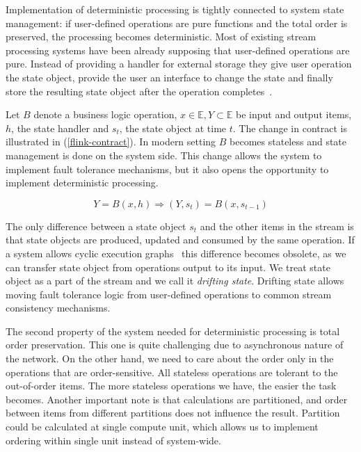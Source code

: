 
\label{motivation-section}

Implementation of deterministic processing is tightly connected to system state management: if user-defined operations are pure functions and the total order is preserved, the processing becomes deterministic. Most of existing stream processing systems have been already supposing that user-defined operations are pure. Instead of providing a handler for external storage they give user operation the state object, provide the user an interface to change the state and finally store the resulting state object after the operation completes~\cite{carbone2015apache, apache:storm, Noghabi:2017:SSS:3137765.3137770}.

Let $B$ denote a business logic operation, $x \in \mathbb{E}, Y \subset \mathbb{E}$ be input and output items, $h$, the state handler and $s_t$, the state object at time $t$. The change in contract is illustrated in (\ref{flink-contract}). In modern setting $B$ becomes stateless and state management is done on the system side. This change allows the system to implement fault tolerance mechanisms, but it also opens the opportunity to implement deterministic processing.

\begin{equation}
\label{flink-contract}
Y = B(x, h) \Rightarrow (Y, s_t) = B(x, s_{t-1}) 
\end{equation}

The only difference between a state object $s_t$ and the other items in the stream is that state objects are produced, updated and consumed by the same operation. If a system allows cyclic execution graphs~\cite{Murray:2013:NTD:2517349.2522738} this difference becomes obsolete, as we can transfer state object from operations output to its input. We treat state object as a part of the stream and we call it {\it drifting state}. Drifting state allows moving fault tolerance logic from user-defined operations to common stream consistency mechanisms.

The second property of the system needed for deterministic processing is total order preservation. This one is quite challenging due to asynchronous nature of the network. On the other hand, we need to care about the order only in the operations that are order-sensitive. All stateless operations are tolerant to the out-of-order items. The more stateless operations we have, the easier the task becomes. Another important note is that calculations are partitioned, and order between items from different partitions does not influence the result. Partition could be calculated at single compute unit, which allows us to implement ordering within single unit instead of system-wide.

